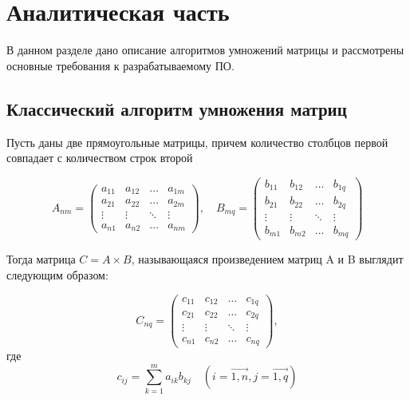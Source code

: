 \documentclass[12pt]{report}
\begin{document}
    \chapter{ Аналитическая часть}
    
	В данном разделе дано описание алгоритмов умножений матрицы и
	рассмотрены основные требования к разрабатываемому ПО.

    \section{Классический алгоритм умножения матриц}
    Пусть даны две прямоугольные матрицы, причем количество столбцов первой
    совпадает с количеством строк второй

    \begin{equation}
        A_{nm} = \begin{pmatrix}
                     a_{11} & a_{12} & \ldots & a_{1m} \\
                     a_{21} & a_{22} & \ldots & a_{2m} \\
                     \vdots & \vdots & \ddots & \vdots \\
                     a_{n1} & a_{n2} & \ldots & a_{nm}
        \end{pmatrix},
        \quad
        B_{mq} = \begin{pmatrix}
                     b_{11} & b_{12} & \ldots & b_{1q} \\
                     b_{21} & b_{22} & \ldots & b_{2q} \\
                     \vdots & \vdots & \ddots & \vdots \\
                     b_{m1} & b_{m2} & \ldots & b_{mq}
        \end{pmatrix}
    \end{equation}

    Тогда матрица $C = A \times B$, называющаяся произведением матриц A и B выглядит следующим образом:

    \begin{equation}
        C_{nq} = \begin{pmatrix}
                     c_{11} & c_{12} & \ldots & c_{1q} \\
                     c_{21} & c_{22} & \ldots & c_{2q} \\
                     \vdots & \vdots & \ddots & \vdots \\
                     c_{n1} & c_{n2} & \ldots & c_{nq}
        \end{pmatrix},
    \end{equation}
    где
    \begin{equation}
        \label{eq:classic_multiply}
        c_{ij} = \sum_{k=1}^{m}a_{ik}b_{kj}\quad(i=\vec{1, n}, j=\vec{1,q})
    \end{equation}
\end{document}
